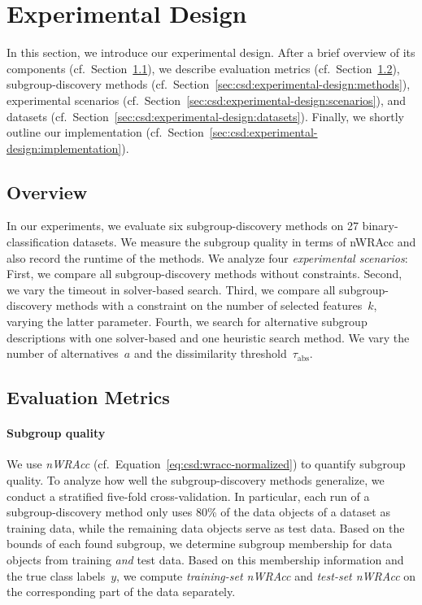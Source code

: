 \documentclass{article}
\theoremstyle{definition}
\begin{document}
\section{Experimental Design}
\label{sec:csd:experimental-design}

In this section, we introduce our experimental design.
After a brief overview of its components (cf.~Section~\ref{sec:csd:experimental-design:overview}), we describe evaluation metrics (cf.~Section~\ref{sec:csd:experimental-design:metrics}), subgroup-discovery methods (cf.~Section~\ref{sec:csd:experimental-design:methods}), experimental scenarios (cf.~Section~\ref{sec:csd:experimental-design:scenarios}), and datasets (cf.~Section~\ref{sec:csd:experimental-design:datasets}).
Finally, we shortly outline our implementation (cf.~Section~\ref{sec:csd:experimental-design:implementation}).

\subsection{Overview}
\label{sec:csd:experimental-design:overview}

In our experiments, we evaluate six subgroup-discovery methods on 27 binary-classification datasets.
We measure the subgroup quality in terms of nWRAcc and also record the runtime of the methods.
We analyze four \emph{experimental scenarios}:
First, we compare all subgroup-discovery methods without constraints.
Second, we vary the timeout in solver-based search.
Third, we compare all subgroup-discovery methods with a constraint on the number of selected features~$k$, varying the latter parameter.
Fourth, we search for alternative subgroup descriptions with one solver-based and one heuristic search method.
We vary the number of alternatives~$a$ and the dissimilarity threshold~$\tau_{\text{abs}}$.

\subsection{Evaluation Metrics}
\label{sec:csd:experimental-design:metrics}

\paragraph{Subgroup quality}

We use \emph{nWRAcc} (cf.~Equation~\ref{eq:csd:wracc-normalized}) to quantify subgroup quality.
To analyze how well the subgroup-discovery methods generalize, we conduct a stratified five-fold cross-validation.
In particular, each run of a subgroup-discovery method only uses 80\% of the data objects of a dataset as training data, while the remaining data objects serve as test data.
Based on the bounds of each found subgroup, we determine subgroup membership for data objects from training \emph{and} test data.
Based on this membership information and the true class labels~$y$, we compute \emph{training-set nWRAcc} and \emph{test-set nWRAcc} on the corresponding part of the data separately.
\end{document}
